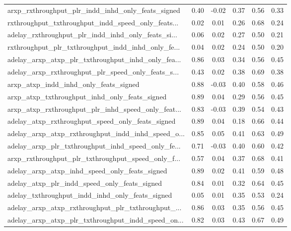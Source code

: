 \begin{tabular}{|l|*{4}{c}|r|}
arxp\_rxthroughput\_plr\_indd\_inhd\_only\_feats\_signed  & 0.40 & -0.02 &    0.37 &       0.56 &  0.33 \\
rxthroughput\_txthroughput\_indd\_speed\_only\_feats... & 0.02 &  0.01 &    0.26 &       0.68 &  0.24 \\
adelay\_rxthroughput\_plr\_indd\_inhd\_only\_feats\_si... & 0.06 &  0.02 &    0.27 &       0.50 &  0.21 \\
rxthroughput\_plr\_txthroughput\_indd\_inhd\_only\_fe... & 0.04 &  0.02 &    0.24 &       0.50 &  0.20 \\
adelay\_arxp\_atxp\_plr\_txthroughput\_inhd\_only\_fea... & 0.86 &  0.03 &    0.34 &       0.56 &  0.45 \\
adelay\_arxp\_rxthroughput\_plr\_speed\_only\_feats\_s... & 0.43 &  0.02 &    0.38 &       0.69 &  0.38 \\
arxp\_atxp\_indd\_inhd\_only\_feats\_signed              & 0.88 & -0.03 &    0.40 &       0.58 &  0.46 \\
arxp\_atxp\_txthroughput\_inhd\_only\_feats\_signed      & 0.89 &  0.04 &    0.29 &       0.56 &  0.45 \\
arxp\_atxp\_rxthroughput\_plr\_inhd\_speed\_only\_feat... & 0.83 & -0.03 &    0.39 &       0.54 &  0.43 \\
adelay\_atxp\_rxthroughput\_speed\_only\_feats\_signed   & 0.89 &  0.04 &    0.18 &       0.66 &  0.44 \\
adelay\_arxp\_atxp\_rxthroughput\_indd\_inhd\_speed\_o... & 0.85 &  0.05 &    0.41 &       0.63 &  0.49 \\
adelay\_arxp\_plr\_txthroughput\_inhd\_speed\_only\_fe... & 0.71 & -0.03 &    0.40 &       0.60 &  0.42 \\
arxp\_rxthroughput\_plr\_txthroughput\_speed\_only\_f... & 0.57 &  0.04 &    0.37 &       0.68 &  0.41 \\
adelay\_arxp\_atxp\_inhd\_speed\_only\_feats\_signed      & 0.89 &  0.02 &    0.41 &       0.59 &  0.48 \\
adelay\_atxp\_plr\_indd\_speed\_only\_feats\_signed       & 0.84 &  0.01 &    0.32 &       0.64 &  0.45 \\
adelay\_txthroughput\_indd\_inhd\_only\_feats\_signed    & 0.05 &  0.01 &    0.35 &       0.53 &  0.24 \\
adelay\_arxp\_atxp\_rxthroughput\_plr\_txthroughput\_... & 0.86 &  0.03 &    0.35 &       0.56 &  0.45 \\
adelay\_arxp\_atxp\_plr\_txthroughput\_indd\_speed\_on... & 0.82 &  0.03 &    0.43 &       0.67 &  0.49 \\

\end{tabular}
